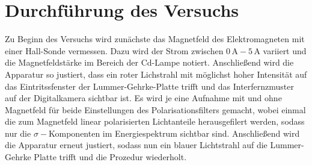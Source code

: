\section{Durchführung des Versuchs}
Zu Beginn des Versuchs wird zunächste das Magnetfeld des Elektromagneten mit einer Hall-Sonde vermessen. Dazu wird der Strom zwischen $0\,\si{\A}-5\,\si{\A}$ variiert und die Magnetfeldstärke im Bereich der
Cd-Lampe notiert.
Anschließend wird die Apparatur so justiert, dass ein roter Lichstrahl mit möglichst hoher Intensität auf das Eintritssfenster der Lummer-Gehrke-Platte trifft und das Interfernzmuster auf der Digitalkamera sichtbar ist.
Es wird je eine Aufnahme mit und ohne Magnetfeld für beide Einstellungen des Polarisationsfilters gemacht, wobei einmal die zum Magnetfeld linear polarisierten Lichtanteile herausgefilert werden, sodass nur die $\sigma-$Komponenten
im Energiespektrum sichtbar sind.
Anschließend wird die Apparatur erneut justiert, sodass nun ein blauer Lichtstrahl auf die Lummer-Gehrke Platte trifft und die Prozedur wiederholt.

\nocite{wingate}
\nocite{*}
\printbibliography

